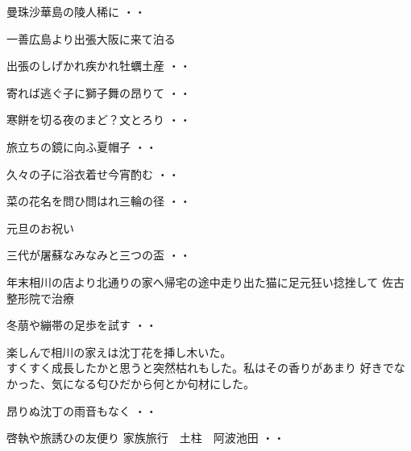 \begin{shiika}曼珠沙華島の陵人稀に
\hfill{・・}\end{shiika}
\vspace{0.6cm}
一善広島より出張大阪に来て泊る
\begin{shiika}出張のしげかれ疾かれ牡蠣土産
\hfill{・・}\end{shiika}
\begin{shiika}寄れば逃ぐ子に獅子舞の昂りて
\hfill{・・}\end{shiika}
\begin{shiika}寒餅を切る夜のまど？文とろり
\hfill{・・}\end{shiika}
\begin{shiika}旅立ちの鏡に向ふ夏帽子
\hfill{・・}\end{shiika}
\begin{shiika}久々の子に浴衣着せ今宵酌む
\hfill{・・}\end{shiika}
\begin{shiika}菜の花名を問ひ問はれ三輪の径
\hfill{・・}\end{shiika}
\vspace{0.6cm}
元旦のお祝い
\begin{shiika}三代が屠蘇なみなみと三つの盃
\hfill{・・}\end{shiika}
\vspace{0.6cm}
年末相川の店より北通りの家へ帰宅の途中走り出た猫に足元狂い捻挫して
佐古整形院で治療
\begin{shiika}冬萠や繃帯の足歩を試す
\hfill{・・}\end{shiika}
\vspace{0.6cm}

楽しんで相川の家えは沈丁花を挿し木いた。\\
すくすく成長したかと思うと突然枯れもした。私はその香りがあまり
好きでなかった、気になる匂ひだから何とか句材にした。
\begin{shiika}昂りぬ沈丁の雨音もなく
\hfill{・・}\end{shiika}
\begin{shiika}啓執や旅誘ひの友便り
家族旅行　土柱　阿波池田
\hfill{・・}\end{shiika}


